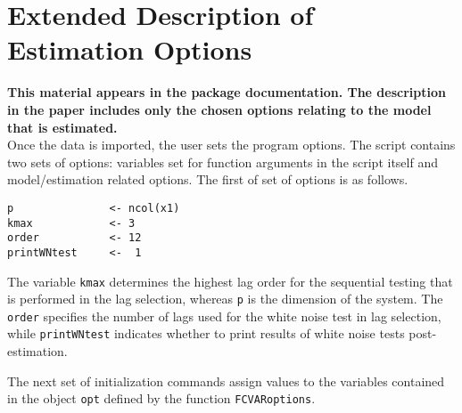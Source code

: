 \documentclass[11pt,letterpaper]{paper}
\let\fct=\texttt
\begin{document}
\section{Extended Description of Estimation Options}

\textbf{This material appears in the package documentation. 
The description in the paper includes only the chosen options relating to the model that is estimated. } \\


Once the data is imported, the user sets the program options. The script contains two sets of options: variables set for function arguments in the script itself and model/estimation related options. 
The first of set of options is as follows. 
% 
\begin{lstlisting}[frame=single,caption={Initialization of local variables}, label = intl]
p               <- ncol(x1) 
kmax            <- 3
order           <- 12
printWNtest     <-  1
\end{lstlisting}

The variable \verb|kmax| determines the highest lag order for the sequential testing that is performed in the lag selection, whereas \verb|p| is the dimension of the system. 
The \verb|order| specifies the number of lags used for the white noise test in lag selection, 
while \verb|printWNtest| indicates whether to print results of white noise tests post-estimation. 


The next set of initialization commands
assign values to the variables contained in the object \verb|opt| defined by the function \fct{FCVARoptions}. 

% 
\end{document}
